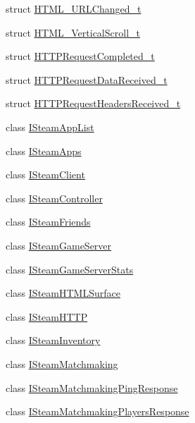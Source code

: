 \begin{DoxyCompactItemize}
\item 
struct \hyperlink{structValve_1_1Steamworks_1_1HTML__URLChanged__t}{H\+T\+M\+L\+\_\+\+U\+R\+L\+Changed\+\_\+t}
\item 
struct \hyperlink{structValve_1_1Steamworks_1_1HTML__VerticalScroll__t}{H\+T\+M\+L\+\_\+\+Vertical\+Scroll\+\_\+t}
\item 
struct \hyperlink{structValve_1_1Steamworks_1_1HTTPRequestCompleted__t}{H\+T\+T\+P\+Request\+Completed\+\_\+t}
\item 
struct \hyperlink{structValve_1_1Steamworks_1_1HTTPRequestDataReceived__t}{H\+T\+T\+P\+Request\+Data\+Received\+\_\+t}
\item 
struct \hyperlink{structValve_1_1Steamworks_1_1HTTPRequestHeadersReceived__t}{H\+T\+T\+P\+Request\+Headers\+Received\+\_\+t}
\item 
class \hyperlink{classValve_1_1Steamworks_1_1ISteamAppList}{I\+Steam\+App\+List}
\item 
class \hyperlink{classValve_1_1Steamworks_1_1ISteamApps}{I\+Steam\+Apps}
\item 
class \hyperlink{classValve_1_1Steamworks_1_1ISteamClient}{I\+Steam\+Client}
\item 
class \hyperlink{classValve_1_1Steamworks_1_1ISteamController}{I\+Steam\+Controller}
\item 
class \hyperlink{classValve_1_1Steamworks_1_1ISteamFriends}{I\+Steam\+Friends}
\item 
class \hyperlink{classValve_1_1Steamworks_1_1ISteamGameServer}{I\+Steam\+Game\+Server}
\item 
class \hyperlink{classValve_1_1Steamworks_1_1ISteamGameServerStats}{I\+Steam\+Game\+Server\+Stats}
\item 
class \hyperlink{classValve_1_1Steamworks_1_1ISteamHTMLSurface}{I\+Steam\+H\+T\+M\+L\+Surface}
\item 
class \hyperlink{classValve_1_1Steamworks_1_1ISteamHTTP}{I\+Steam\+H\+T\+T\+P}
\item 
class \hyperlink{classValve_1_1Steamworks_1_1ISteamInventory}{I\+Steam\+Inventory}
\item 
class \hyperlink{classValve_1_1Steamworks_1_1ISteamMatchmaking}{I\+Steam\+Matchmaking}
\item 
class \hyperlink{classValve_1_1Steamworks_1_1ISteamMatchmakingPingResponse}{I\+Steam\+Matchmaking\+Ping\+Response}
\item 
class \hyperlink{classValve_1_1Steamworks_1_1ISteamMatchmakingPlayersResponse}{I\+Steam\+Matchmaking\+Players\+Response}
\item 

\end{DoxyCompactItemize}

